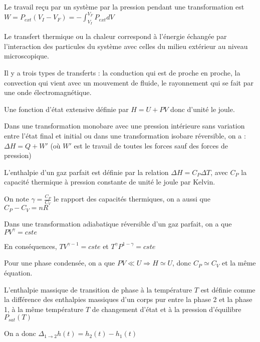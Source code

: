 \documentclass[a4paper,12pt]{book}
\newcommand{\Def}[2]{\begin{tcolorbox}[colback=white,colframe=red!10!green!20!blue!75!, title=Définition : #1]#2\end{tcolorbox}}
\newcommand{\Thr}[2]{\begin{tcolorbox}[sharp corners, colback=white,colframe=red!10!blue!30!green!75!, title=Théorème : #1]#2\end{tcolorbox}}
\begin{document}
\Thr{Travail}{Le travail reçu par un système par la pression pendant une transformation est $W = P_{ext}(V_I-V_F) = -\int_{V_I}^{V_F}P_{ext}dV$}
\Thr{Transfert thermique}{Le transfert thermique ou la chaleur correspond à l'énergie échangée par l'interaction des particules du système avec celles du milieu extérieur au niveau microscopique.
\par Il y a trois types de transferts : la conduction qui est de proche en proche, la convection qui vient avec un mouvement de fluide, le rayonnement qui se fait par une onde électromagnétique.}
\Def{Enthalpie}{Une fonction d'état extensive définie par $H = U + PV$ donc d'unité le joule.
\par Dans une transformation monobare avec une pression intérieure sans variation entre l'état final et initial ou dans une transformation isobare réversible, on a : $\Delta H = Q +W'$ (où $W'$ est le travail de toutes les forces sauf des forces de pression)
\par L'enthalpie d'un gaz parfait est définie par la relation $\Delta H = C_P\Delta T$, avec $C_P$ la capacité thermique à pression constante de unité le joule par Kelvin.
\par On note $\gamma =\frac{C_P}{C_V}$ le rapport des capacités thermiques, on a aussi que $C_P-C_V = nR$
\par Dans une transformation adiabatique réversible d'un gaz parfait, on a que $PV^\gamma = cste$
\par En conséquences, $TV^{\gamma-1} =cste$ et $T^\gamma P^{1-\gamma}=cste$
\par Pour une phase condensée, on a que $PV\ll U\Rightarrow H\simeq U$, donc $C_P\simeq C_V$ et la même équation.}
\Def{Enthalpie massique de transition de phase}{L'enthalpie massique de transition de phase à la température $T$ est définie comme la différence des enthalpies massiques d'un corps pur entre la phase 2 et la phase 1, à la même température $T$ de changement d'état et à la pression d'équilibre $P_{sat}(T)$
\par On a donc $\Delta_{1\to 2}h(t) = h_2(t)-h_1(t)$}
\end{document}
